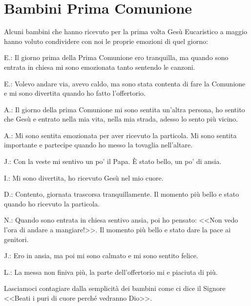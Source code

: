 \section{Bambini Prima Comunione}

Alcuni bambini che hanno ricevuto per la prima volta Gesù Eucaristico a maggio
hanno voluto condividere con noi le proprie emozioni di quel giorno:

E.: Il giorno prima della Prima Comunione ero tranquilla, ma quando sono
entrata in chiesa mi sono emozionata tanto sentendo le canzoni.

E.: Volevo andare via, avevo caldo, ma sono stata contenta di fare la
Comunione e mi sono divertita quando ho fatto l'offertorio.

A.: Il giorno della prima Comunione mi sono sentita un'altra persona, ho
sentito che Gesù e entrato nella mia vita, nella mia strada, adesso lo sento
più vicino.

A.: Mi sono sentita emozionata per aver ricevuto la particola. Mi sono sentita
importante e partecipe quando ho messo la tovaglia nell'altare.

J.: Con la veste mi sentivo un po' il Papa. È stato bello, un po' di ansia.

I.: Mi sono divertita, ho ricevuto Gesù nel mio cuore.

D.: Contento, giornata trascorsa tranquillamente. Il momento più bello e stato
quando ho ricevuto la particola.

N.: Quando sono entrata in chiesa sentivo ansia, poi ho pensato: <<Non vedo
l'ora di andare a mangiare!>>. Il momento più bello e stato dare la pace ai
genitori.

J.: Ero in ansia, ma poi mi sono calmato e mi sono sentito felice.

L.: La messa non finiva più, la parte dell'offertorio mi e piaciuta di più.

Lasciamoci contagiare dalla semplicità dei bambini come ci dice il Signore
<<Beati i puri di cuore perché vedranno Dio>>.


